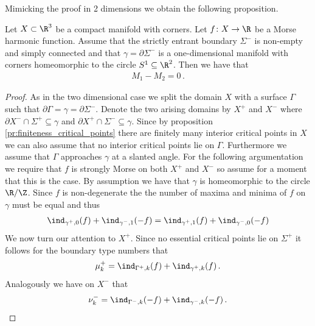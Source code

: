 Mimicking the proof in 2 dimensions we obtain the following proposition.
\begin{proposition}
  Let $X\subset\R^3$ be a compact manifold with corners.
  Let $f\colon X\to\R$ be a Morse harmonic function. Assume that the strictly entrant boundary $\Sigma^-$ is non-empty and simply connected
  and that $\gamma=\partial\Sigma^-$ is a one-dimensional manifold with corners homeomorphic to the circle $S^1\subseteq\R^2$.
  Then we have that
  \begin{align*}
    M_1-M_2=0\,.
  \end{align*}
\end{proposition}
\begin{proof}
  As in the two dimensional case we split the domain $X$ with a surface $\Gamma$ such that
  $\partial\Gamma=\gamma=\partial\Sigma^-$.
  Denote the two arising domains by $X^+$ and $X^-$ where $\partial X^-\cap\Sigma^+\subseteq\gamma$ and
  $\partial X^+\cap \Sigma^-\subseteq\gamma$.
  Since by proposition \ref{pr:finiteness_critical_points} there are finitely many interior critical points in $X$
  we can also assume that no interior critical points lie on $\Gamma$.
  Furthermore we assume that $\Gamma$ approaches $\gamma$ at a slanted angle.
  For the following argumentation we require that $f$ is strongly Morse on both $X^+$ and
  $X^-$ so assume for a moment that this is the case.
  By assumption we have that $\gamma$ is homeomorphic to the circle $\R/\Z$.
  Since $f$ is non-degenerate the
  the number of maxima and minima of $f$ on $\gamma$ must be equal and thus
  \begin{align}
    \ind_{\gamma^+,0}(f)+\ind_{\gamma^-,1}(-f)=\ind_{\gamma^+,1}(f)+\ind_{\gamma^-,0}(-f)
    \label{eq:n3_disproof_morse_maxMinRel}
  \end{align}
  We now turn our attention to $X^+$. Since no essential critical points lie on $\Sigma^+$ 
  it follows for the boundary type numbers that
  \begin{align}
    \mu^+_k=\ind_{\Gamma^+, k}(f)+\ind_{\gamma^+,k}(f)\,.\label{eq:n3_disproof_morse_muplus}
  \end{align}
  Analogously we have on $X^-$ that
  \begin{align}
    \nu^-_k=\ind_{\Gamma^-,k}(-f)+\ind_{\gamma^-,k}(-f)\,.\label{eq:n3_disproof_morse_numinus}
  \end{align}

\end{proof}
